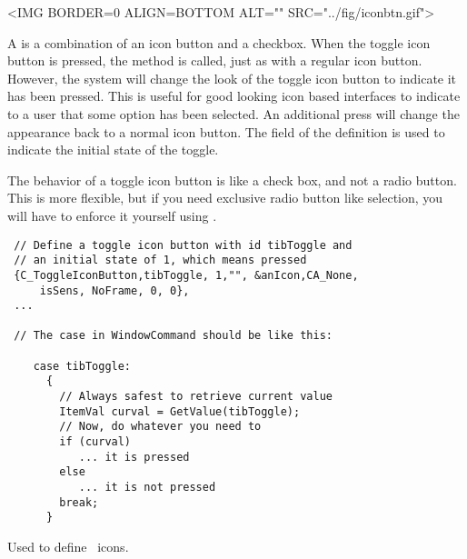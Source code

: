 
\small
\begin{rawhtml}
<IMG BORDER=0 ALIGN=BOTTOM ALT="" SRC="../fig/iconbtn.gif">
\end{rawhtml}
\begin{latexonly}

\end{latexonly}
\normalfont\normalsize
\vspace{.1in}

A  is a combination of an icon
button and a checkbox. When the toggle icon button is pressed,
the  method is called, just
as with a regular icon button. However, the system will change
the look of the toggle icon button to indicate it has been
pressed. This is useful for good looking icon based interfaces
to indicate to a user that some option has been selected.
An additional press will change the appearance back to a
normal icon button. The  field of the 
definition is used to indicate the initial state of the
toggle.

The behavior of a toggle icon button is like a check box, and
not a radio button. This is more flexible, but if you need
exclusive radio button like selection, you will have to
enforce it yourself using . 

\begin{verbatim}
 // Define a toggle icon button with id tibToggle and
 // an initial state of 1, which means pressed
 {C_ToggleIconButton,tibToggle, 1,"", &anIcon,CA_None,
     isSens, NoFrame, 0, 0},
 ...

 // The case in WindowCommand should be like this:

    case tibToggle:
      {
        // Always safest to retrieve current value
        ItemVal curval = GetValue(tibToggle);
        // Now, do whatever you need to
        if (curval)
           ... it is pressed
        else
           ... it is not pressed
        break;
      }

\end{verbatim}


Used to define \V\ icons.

